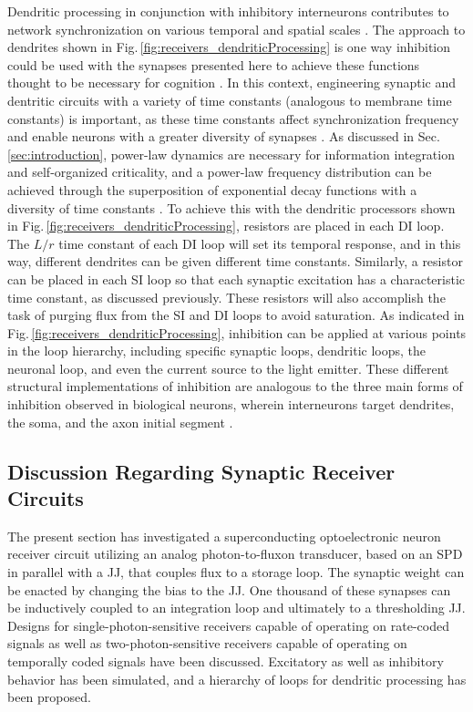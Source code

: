 \documentclass[aip,amsmath,amssymb,reprint,nofootinbib]{revtex4-1}
\begin{document}
Dendritic processing in conjunction with inhibitory interneurons contributes to network synchronization on various temporal and spatial scales \cite{vala2001,enfr2001,sase2001,bu2006,buwa2012,robu2015}. The approach to dendrites shown in Fig.\,\ref{fig:receivers_dendriticProcessing} is one way inhibition could be used with the synapses presented here to achieve these functions thought to be necessary for cognition \cite{budr2004,fr2015}. In this context, engineering synaptic and dentritic circuits with a variety of time constants (analogous to membrane time constants) is important, as these time constants affect synchronization frequency \cite{lued1997} and enable neurons with a greater diversity of synapses \cite{ma2016}. As discussed in Sec.\,\ref{sec:introduction}, power-law dynamics are necessary for information integration and self-organized criticality, and a power-law frequency distribution can be achieved through the superposition of exponential decay functions with a diversity of time constants \cite{be2007}. To achieve this with the dendritic processors shown in Fig.\,\ref{fig:receivers_dendriticProcessing}, resistors are placed in each DI loop. The $L/r$ time constant of each DI loop will set its temporal response, and in this way, different dendrites can be given different time constants. Similarly, a resistor can be placed in each SI loop so that each synaptic excitation has a characteristic time constant, as discussed previously. These resistors will also accomplish the task of purging flux from the SI and DI loops to avoid saturation. As indicated in Fig.\,\ref{fig:receivers_dendriticProcessing}, inhibition can be applied at various points in the loop hierarchy, including specific synaptic loops, dendritic loops, the neuronal loop, and even the current source to the light emitter. These different structural implementations of inhibition are analogous to the three main forms of inhibition observed in biological neurons, wherein interneurons target dendrites, the soma, and the axon initial segment \cite{robu2015}.
	
\subsection{\label{sec:discussion_receiverCircuits}Discussion Regarding Synaptic Receiver Circuits}
The present section has investigated a superconducting optoelectronic neuron receiver circuit utilizing an analog photon-to-fluxon transducer, based on an SPD in parallel with a JJ, that couples flux to a storage loop. The synaptic weight can be enacted by changing the bias to the JJ. One thousand of these synapses can be inductively coupled to an integration loop and ultimately to a thresholding JJ. Designs for single-photon-sensitive receivers capable of operating on rate-coded signals as well as two-photon-sensitive receivers capable of operating on temporally coded signals have been discussed. Excitatory as well as inhibitory behavior has been simulated, and a hierarchy of loops for dendritic processing has been proposed.
\end{document}
